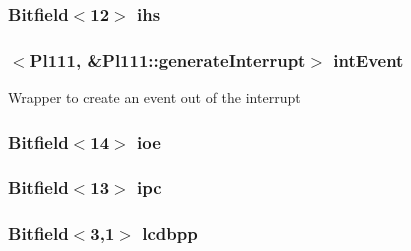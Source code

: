 \label{classPl111_aa182f542482835ddda6ef4d523791f30}
\hypertarget{classPl111_ae5c21231f6311c0299549cda5105cf33}{
\subsubsection[{ihs}]{\setlength{\rightskip}{0pt plus 5cm}Bitfield$<$12$>$ {\bf ihs}}}
\label{classPl111_ae5c21231f6311c0299549cda5105cf33}
\hypertarget{classPl111_a091cc936e2951ae8884e7a54b184811c}{
\subsubsection[{intEvent}]{$<${\bf Pl111}, \&Pl111::generateInterrupt$>$ {\bf intEvent}}}
\label{classPl111_a091cc936e2951ae8884e7a54b184811c}
Wrapper to create an event out of the interrupt \hypertarget{classPl111_a3a6ed57843b9f0709822190663f6477b}{
\subsubsection[{ioe}]{\setlength{\rightskip}{0pt plus 5cm}Bitfield$<$14$>$ {\bf ioe}}}
\label{classPl111_a3a6ed57843b9f0709822190663f6477b}
\hypertarget{classPl111_ae88299d5dc68d6f0f720586f30ad627a}{
\subsubsection[{ipc}]{\setlength{\rightskip}{0pt plus 5cm}Bitfield$<$13$>$ {\bf ipc}}}
\label{classPl111_ae88299d5dc68d6f0f720586f30ad627a}
\hypertarget{classPl111_abd7707fa3d87acffedc6f4c9209c7c79}{
\subsubsection[{lcdbpp}]{\setlength{\rightskip}{0pt plus 5cm}Bitfield$<$3,1$>$ {\bf lcdbpp}}}
